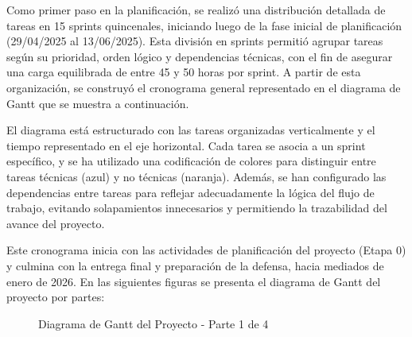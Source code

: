 \documentclass[
11pt, %
]{charter}
\begin{document}
Como primer paso en la planificación, se realizó una distribución detallada de tareas en 15 sprints quincenales, iniciando luego de la fase inicial de planificación (29/04/2025 al 13/06/2025). Esta división en sprints permitió agrupar tareas según su prioridad, orden lógico y dependencias técnicas, con el fin de asegurar una carga equilibrada de entre 45 y 50 horas por sprint. A partir de esta organización, se construyó el cronograma general representado en el diagrama de Gantt que se muestra a continuación.

El diagrama está estructurado con las tareas organizadas verticalmente y el tiempo representado en el eje horizontal. Cada tarea se asocia a un sprint específico, y se ha utilizado una codificación de colores para distinguir entre tareas técnicas (azul) y no técnicas (naranja). Además, se han configurado las dependencias entre tareas para reflejar adecuadamente la lógica del flujo de trabajo, evitando solapamientos innecesarios y permitiendo la trazabilidad del avance del proyecto.

Este cronograma inicia con las actividades de planificación del proyecto (Etapa 0) y culmina con la entrega final y preparación de la defensa, hacia mediados de enero de 2026. En las siguientes figuras se presenta el diagrama de Gantt del proyecto por partes:


\begin{figure}[htpb]
\centering
{}
\caption{Diagrama de Gantt del Proyecto - Parte 1 de 4}
\label{fig:diagBloques}
\end{figure}
\end{document}
